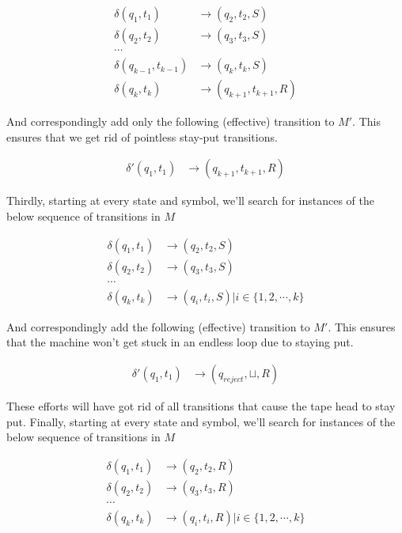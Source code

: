 \documentclass{article}
\begin{document}
\begin{align*}
    \delta(q_1, t_1)             & \rightarrow (q_2, t_2, S) \\
    \delta(q_2, t_2)             & \rightarrow (q_3, t_3, S) \\
    \cdots \\
    \delta(q_{k - 1}, t_{k - 1}) & \rightarrow (q_k, t_k, S) \\
    \delta(q_k, t_k)             & \rightarrow (q_{k + 1}, t_{k + 1}, R)
\end{align*}

And correspondingly add only the following (effective) transition to $M'$. This ensures that we get rid of pointless stay-put transitions.

\begin{align*}
    \delta'(q_1, t_1) & \rightarrow (q_{k + 1}, t_{k + 1}, R)
\end{align*}

Thirdly, starting at every state and symbol, we'll search for instances of the below sequence of transitions in $M$

\begin{align*}
    \delta(q_1, t_1)             & \rightarrow (q_2, t_2, S) \\
    \delta(q_2, t_2)             & \rightarrow (q_3, t_3, S) \\
    \cdots \\
    \delta(q_k, t_k)             & \rightarrow (q_i, t_i, S) | i \in \{1, 2, \cdots , k\}
\end{align*}

And correspondingly add the following (effective) transition to $M'$. This ensures that the machine won't get stuck in an endless loop due to staying put.

\begin{align*}
    \delta'(q_1, t_1) & \rightarrow (q_{reject}, \sqcup, R)
\end{align*}

These efforts will have got rid of all transitions that cause the tape head to stay put. Finally, starting at every state and symbol, we'll search for instances of the below sequence of transitions in $M$

\begin{align*}
    \delta(q_1, t_1)             & \rightarrow (q_2, t_2, R) \\
    \delta(q_2, t_2)             & \rightarrow (q_3, t_3, R) \\
    \cdots \\
    \delta(q_k, t_k)             & \rightarrow (q_i, t_i, R) | i \in \{1, 2, \cdots , k\}
\end{align*}
\end{document}

